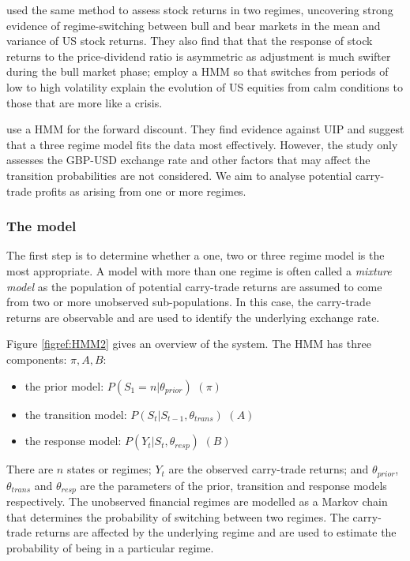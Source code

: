 \documentclass[12pt, a4paper, oneside]{article}\usepackage[]{graphicx}\usepackage[]{color}
\begin{document}
\citet{schaller1997regime} used the same method to assess stock returns in two regimes, uncovering strong evidence of regime-switching between bull and bear markets in the mean and variance of US stock returns.  They also find that that the response of stock returns to the price-dividend ratio is asymmetric as adjustment is much swifter during the bull market phase; \citet{dueker1997markov} employ a HMM so that switches from periods of low to high volatility explain the evolution of US equities from calm conditions to those that are more like a crisis.

\citet{Elliot} use a HMM for the forward discount. They find evidence against UIP and suggest that a three regime model fits the data most effectively.  However, the study only assesses the GBP-USD exchange rate and other factors that may affect the transition probabilities are not considered.  We aim to analyse potential carry-trade profits as arising from one or more regimes.  

\subsubsection{The model}
The first step is to determine whether a one, two or three regime model is the most appropriate.  A  model with more than one regime is often called a \emph{mixture model} as the population of potential carry-trade returns are assumed to come from two or more unobserved sub-populations.  
 In this case, the carry-trade returns are observable and are used to identify the underlying exchange rate.  

Figure \ref{figref:HMM2} gives an overview of the system.  The HMM has three components: $\pi, A, B$:

\begin{itemize}
\item the prior model: $P(S_1 = n| \theta_{prior})$ $(\pi)$
\item the transition model: $P(S_t| S_{t-1}, \theta_{trans})$ $(A)$
\item the response model: $P(Y_t| S_t, \theta_{resp})$ $(B)$
\end{itemize}

There are $n$ states or regimes; $Y_t$ are the observed carry-trade returns; and $\theta_{prior}$, $\theta_{trans}$ and  $\theta_{resp}$ are the parameters of the prior, transition and response models respectively. The unobserved financial regimes are modelled as a Markov chain that determines the probability of switching between two regimes.  The carry-trade returns are affected by the underlying regime and are used to estimate the probability of being in a particular regime.    
\end{document}
